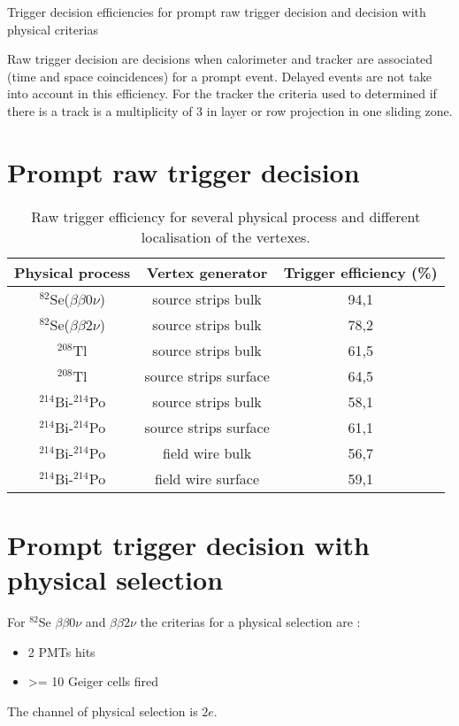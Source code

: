 \documentclass[12pt,a4paper]{article}
\newcommand{\BBZN}{$\beta\beta{}0\nu$}
\newcommand{\BBDN}{$\beta\beta{}2\nu$}
\newcommand{\SE}{$^{82}$Se}
\newcommand{\TL}{$^{208}$Tl}
\newcommand{\BIQ}{$^{214}$Bi}
\newcommand{\POQ}{$^{214}$Po}
\begin{document}
\begin{center}
 \huge{Trigger decision efficiencies for prompt raw trigger decision and decision with physical criterias}
\end{center}

Raw trigger decision are decisions when calorimeter and tracker are associated (time and space coincidences) for a prompt event. Delayed events are not take into account in this efficiency.
For the tracker the criteria used to determined if there is a track is a multiplicity of 3 in layer or row projection in one sliding zone.

\section{Prompt raw trigger decision}
\begin{table}[!h]
 \begin{center}
  \begin{tabular}{|c||c|c|}
    \hline
    Physical process   & Vertex generator      & Trigger efficiency (\%)  \\
    \hline
    \SE(\BBZN)         & source strips bulk    & 94,1 \\
    \SE(\BBDN)         & source strips bulk    & 78,2 \\
    \TL                & source strips bulk    & 61,5 \\
    \TL                & source strips surface & 64,5 \\
    \BIQ-\POQ          & source strips bulk    & 58,1 \\
    \BIQ-\POQ          & source strips surface & 61,1 \\
    \BIQ-\POQ          & field wire bulk       & 56,7 \\
    \BIQ-\POQ          & field wire surface    & 59,1 \\
    \hline
  \end{tabular}
  \end{center}
  \caption{Raw trigger efficiency for several physical process and different localisation of the vertexes.}
\label{raw_efficacity_trigger}
\end{table}

\section{Prompt trigger decision with physical selection}	
For \SE{} \BBZN{} and \BBDN{} the criterias for a physical selection are : 
\begin{itemize}
 \item 2 PMTs hits
 \item >= 10 Geiger cells fired
\end{itemize}
The channel of physical selection is $2e$.\\
\end{document}
